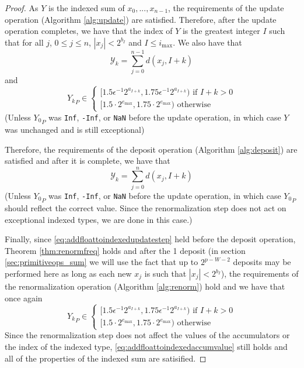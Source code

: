   \begin{proof}
    As $Y$ is the indexed sum of $x_0, ..., x_{n - 1}$, the requirements of the update operation (Algorithm \ref{alg:update}) are satisfied. Therefore, after the update operation completes, we have that the index of $Y$ is the greatest integer $I$ such that for all $j$, $0 \leq j \leq n$, $|x_j| < 2^{b_I}$ and $I \leq i_{\max}$. We also have that 
\[
\mathcal{Y}_k = \sum\limits_{j = 0}^{n - 1} d(x_j, I + k)
\]
  and
  \begin{equation}
          {Y_k}_P \in \begin{cases}[1.5  \epsilon^{-1} 2^{a_{I + k}}, 1.75  \epsilon^{-1} 2^{a_{I + k}}) \text{ if } I + k > 0 \\ [1.5 \cdot 2^{e_{\max}}, 1.75 \cdot 2^{e_{\max}})\text{ otherwise}\end{cases} \label{eq:addfloattoindexedupdatestep}
  \end{equation}
  (Unless ${Y_0}_P$ was \texttt{Inf}, \texttt{-Inf}, or \texttt{NaN} before the update operation, in which case $Y$ was unchanged and is still exceptional)

  Therefore, the requirements of the deposit operation (Algorithm \ref{alg:deposit}) are satisfied and after it is complete, we have that
  \begin{equation}
    \mathcal{Y}_k = \sum\limits_{j = 0}^{n} d(x_j, I + k)
    \label{eq:addfloattoindexedaccumvalue}
  \end{equation}
  (Unless ${Y_0}_P$ was \texttt{Inf}, \texttt{-Inf}, or \texttt{NaN} before the update operation, in which case ${Y_0}_P$ should reflect the correct value. Since the renormalization step does not act on exceptional indexed types, we are done in this case.)

  Finally, since \eqref{eq:addfloattoindexedupdatestep} held before the deposit operation, Theorem \ref{thm:renormfreq} holds and after the 1 deposit (in section \ref{sec:primitiveops_sum} we will use the fact that up to $2^{p - W - 2}$ deposits may be performed here as long as each new $x_j$ is such that $|x_j| < 2^{b_I}$), the requirements of the renormalization operation (Algorithm \ref{alg:renorm}) hold and we have that once again
  \[
  {Y_k}_P \in \begin{cases}[1.5  \epsilon^{-1} 2^{a_{I + k}}, 1.75  \epsilon^{-1} 2^{a_{I + k}}) \text{ if } I + k > 0 \\ [1.5 \cdot 2^{e_{\max}}, 1.75 \cdot 2^{e_{\max}})\text{ otherwise}\end{cases}
  \]
  Since the renormalization step does not affect the values of the accumulators or the index of the indexed type, \eqref{eq:addfloattoindexedaccumvalue} still holds and all of the properties of the indexed sum are satisified.
  \end{proof}

